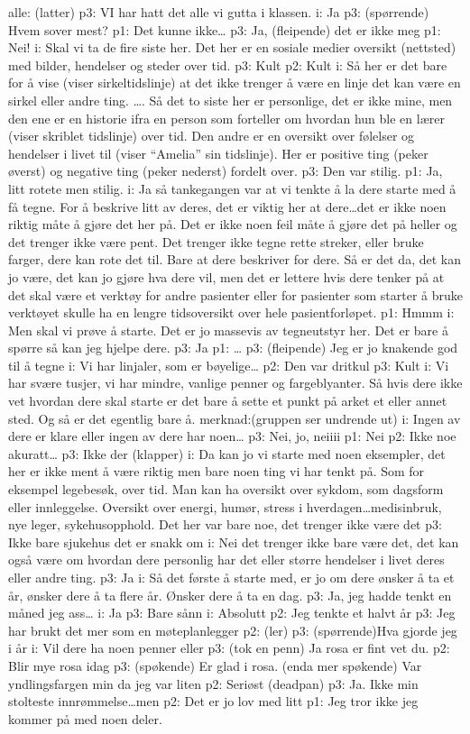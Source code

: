 \documentclass[11pt,UKenglish, a4paper]{article}
\begin{document}
alle: (latter)
p3: VI har hatt det alle vi gutta i klassen.
i: Ja
p3: (spørrende) Hvem sover mest?
p1: Det kunne ikke\dots
p3: Ja, (fleipende) det er ikke meg
p1: Nei!
i: Skal vi ta de fire siste her. Det her er en sosiale medier oversikt (nettsted) med bilder, hendelser og steder over tid.
p3: Kult
p2: Kult
i: Så her er det bare for å vise (viser sirkeltidslinje) at det ikke trenger å være en linje det kan være en sirkel eller andre ting. \dots. Så det to siste her er personlige, det er ikke mine, men den ene er en historie ifra en person som forteller om hvordan hun ble en lærer (viser skriblet tidslinje) over tid. Den andre er en oversikt over følelser og hendelser i livet til (viser ``Amelia'' sin tidslinje). Her er positive ting (peker øverst) og negative ting (peker nederst) fordelt over.
p3: Den var stilig.
p1: Ja, litt rotete men stilig.
i: Ja så tankegangen var at vi tenkte å la dere starte med å få tegne. For å beskrive litt av deres, det er viktig her at dere\dots det er ikke noen riktig måte å gjøre det her på. Det er ikke noen feil måte å gjøre det på heller og det trenger ikke være pent. Det trenger ikke tegne rette streker, eller bruke farger, dere kan rote det til. Bare at dere beskriver for dere. Så er det da, det kan jo være, det kan jo gjøre hva dere vil, men det er lettere hvis dere tenker på at det skal være et verktøy for andre pasienter eller for pasienter som starter å bruke verktøyet skulle ha en lengre tidsoversikt over hele pasientforløpet. 
p1: Hmmm
i: Men skal vi prøve å starte. Det er jo massevis av tegneutstyr her. Det er bare å spørre så kan jeg hjelpe dere. 
p3: Ja
p1: \dots
p3: (fleipende) Jeg er jo knakende god til å tegne
i: Vi har linjaler, som er bøyelige\dots
p2: Den var dritkul
p3: Kult
i: Vi har svære tusjer, vi har mindre, vanlige penner og fargeblyanter. Så hvis dere ikke vet hvordan dere skal starte er det bare å sette et punkt på arket et eller annet sted. Og så er det egentlig bare å. 
merknad:(gruppen ser undrende ut)
i: Ingen av dere er klare eller ingen av dere har noen\dots
p3: Nei, jo, neiiii 
p1: Nei
p2: Ikke noe akuratt\dots
p3: Ikke der (klapper)
i: Da kan jo vi starte med noen eksempler, det her er ikke ment å være riktig men bare noen ting vi har tenkt på. Som for eksempel legebesøk, over tid. Man kan ha oversikt over sykdom, som dagsform eller innleggelse. Oversikt over energi, humør, stress i hverdagen\dots medisinbruk, nye leger, sykehusopphold. Det her var bare noe, det trenger ikke være det
p3: Ikke bare sjukehus det er snakk om
i: Nei det trenger ikke bare være det, det kan også være om hvordan dere personlig har det eller større hendelser i livet deres eller andre ting. 
p3: Ja
i: Så det første å starte med, er jo om dere ønsker å ta et år, ønsker dere å ta flere år. Ønsker dere å ta en dag.
p3: Ja, jeg hadde tenkt en måned jeg ass\dots
i: Ja
p3: Bare sånn
i: Absolutt
p2: Jeg tenkte et halvt år
p3: Jeg har brukt det mer som en møteplanlegger
p2: (ler)
p3: (spørrende)Hva gjorde jeg i år
i: Vil dere ha noen penner eller 
p3: (tok en penn) Ja rosa er fint vet du.
p2: Blir mye rosa idag
p3: (spøkende) Er glad i rosa. (enda mer spøkende) Var yndlingsfargen min da jeg var liten
p2: Seriøst (deadpan)
p3: Ja. Ikke min stolteste innrømmelse\dots men
p2: Det er jo lov med litt
p1: Jeg tror ikke jeg kommer på med noen deler.
\end{document}
